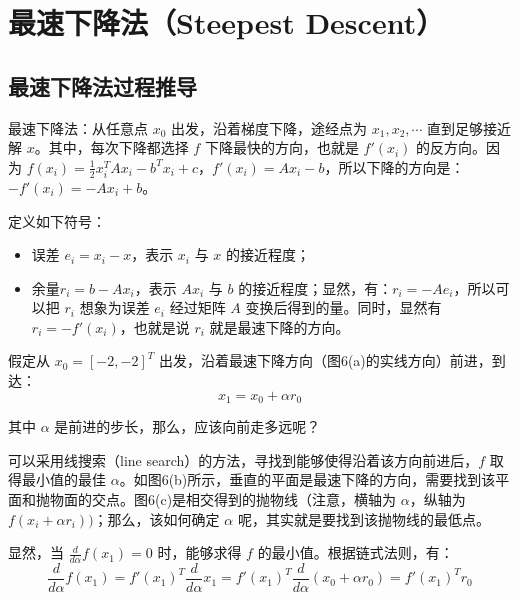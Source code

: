 \documentclass[12pt]{article}
\begin{document}
\section{最速下降法（Steepest Descent）}
\subsection{最速下降法过程推导}
最速下降法：从任意点 $x_0$ 出发，沿着梯度下降，途经点为 $x_1, x_2, \cdots $ 直到足够接近解 $x$。其中，每次下降都选择 $f$ 下降最快的方向，也就是 $f'(x_i)$ 的反方向。因为 $f(x_i) = \frac{1}{2}x_i^TAx_i - b^Tx_i + c$，$f'(x_i) = Ax_i - b$，所以下降的方向是：$-f'(x_i) = -Ax_i + b$。

定义如下符号：
\begin{itemize}
\setlength{\itemsep}{0pt}
\setlength{\parsep}{0pt}
\setlength{\parskip}{0pt}
    \item 误差 $e_i = x_i - x$，表示 $x_i$ 与 $x$ 的接近程度；
    \item 余量$r_i = b - Ax_i$，表示 $Ax_i$ 与 $b$ 的接近程度；显然，有：$r_i = -Ae_i$，所以可以把 $r_i$ 想象为误差 $e_i$ 经过矩阵 $A$ 变换后得到的量。同时，显然有 $r_i = -f'(x_i)$，也就是说 $r_i$ 就是最速下降的方向。
\end{itemize}

假定从 $x_0 = [-2, -2]^T$ 出发，沿着最速下降方向（图6(a)的实线方向）前进，到达：
$$
x_1 = x_0 + \alpha r_0
$$

其中 $\alpha$ 是前进的步长，那么，应该向前走多远呢？

可以采用线搜索（line search）的方法，寻找到能够使得沿着该方向前进后，$f$ 取得最小值的最佳 $\alpha$。如图6(b)所示，垂直的平面是最速下降的方向，需要找到该平面和抛物面的交点。图6(c)是相交得到的抛物线（注意，横轴为 $\alpha$，纵轴为 $f(x_i + \alpha r_i))$；那么，该如何确定 $\alpha$ 呢，其实就是要找到该抛物线的最低点。

显然，当 $\frac{d}{d\alpha}f(x_1) = 0$ 时，能够求得 $f$ 的最小值。根据链式法则，有：
$$
\frac{d}{d\alpha}f(x_1) = f'(x_1)^T\frac{d}{d\alpha}x_1 =  f'(x_1)^T\frac{d}{d\alpha}(x_0 + \alpha r_0) =  f'(x_1)^Tr_0
$$
\end{document}
